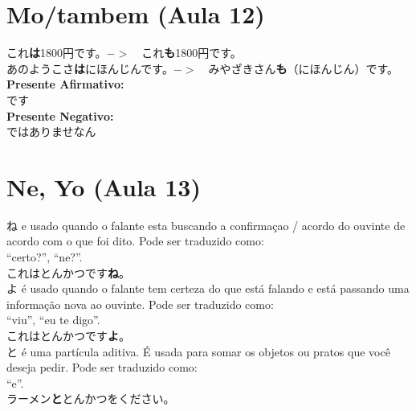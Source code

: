 \documentclass[a4paper, 12pt]{article}
\begin{document}
\section{Mo/tambem (Aula 12)}
\begin{CJK}{UTF8}{min}
	これ\textbf{は}1800円です。$ -> $　これ\textbf{も}1800円です。\\
	
	あのようこさ\textbf{は}にほんじんです。$ -> $　みやざきさん\textbf{も}（にほんじん）です。\\
	
	\textbf{Presente Afirmativo:}\\
	です\\
	
	\textbf{Presente Negativo:}\\
	ではありませなん\\
	
	
\end{CJK}

\section{Ne, Yo (Aula 13)}
\begin{CJK}{UTF8}{min}
	ね e usado quando o falante esta buscando a confirmaçao / acordo do ouvinte de acordo com	o que foi dito. Pode ser traduzido como:\\
	“certo?”, “ne?”.\\
	これはとんかつです\textbf{ね}。\\
	
	よ é usado quando o falante tem certeza do que está falando e está passando uma	informação nova ao ouvinte. Pode ser traduzido como: \\
	“viu”, “eu te digo”.\\
	これはとんかつです\textbf{よ}。\\
	
	と é uma partícula aditiva. É usada para somar	os objetos ou pratos que você deseja pedir.	Pode ser traduzido como: \\“e”.\\
	ラーメン\textbf{と}とんかつをください。\\
	
	
\end{CJK}
\end{document}
